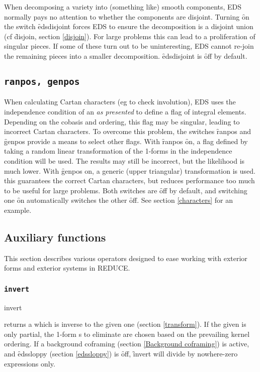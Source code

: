 When decomposing a variety into (something like) smooth components, EDS
normally pays no attention to whether the components are disjoint. Turning
\f{on} the switch \f{edsdisjoint} forces EDS to ensure the decomposition is
a disjoint union (cf \f{disjoin}, section \ref{disjoin}). For large
problems this can lead to a proliferation of singular pieces. If some of
these turn out to be uninteresting, EDS cannot re-join the remaining pieces
into a smaller decomposition. \f{edsdisjoint} is \f{off} by default.

\subsection{\tt ranpos, genpos}
\label{ranpos}

When calculating Cartan characters (eg to check involution), EDS uses the
independence condition of an  {\em as presented} to define a flag
of integral elements. Depending on the cobasis and ordering, this flag may
be singular, leading to incorrect Cartan characters. To overcome this
problem, the switches \f{ranpos} and \f{genpos} provide a means to select
other flags. With \f{ranpos} \f{on}, a flag defined by taking a random
linear transformation of the 1-forms in the independence condition will be
used. The results may still be incorrect, but the likelihood is much lower.
With \f{genpos} on, a generic (upper triangular) transformation is
used. this guarantees the correct Cartan characters, but reduces
performance too much to be useful for large problems. Both switches are
\f{off} by default, and switching one \f{on} automatically switches the other
\f{off}. See section \ref{characters} for an example.



\subsection{Auxiliary functions}
\label{Auxiliary functions}

This section describes various operators designed to ease working with
exterior forms and exterior systems in REDUCE.

\subsubsection{\tt invert}
\label{invert}

\begin{edssyntax}
	invert 
\end{edssyntax}
returns a  which is inverse to the given one (section
\ref{transform}). If the  given is only partial, the
1-form s to eliminate are chosen based on the prevailing
kernel ordering. If a background coframing (section \ref{Background
coframing}) is active, and \f{edssloppy} (section \ref{edssloppy}) is
\f{off}, \f{invert} will divide by nowhere-zero expressions only.


